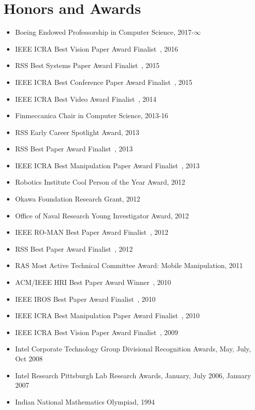 

\section{Honors and Awards}
\begin{itemize}
\addtolength{\itemsep}{-0.5\baselineskip}
\item Boeing Endowed Professorship in Computer Science, 2017-$\infty$
\item IEEE ICRA Best Vision Paper Award Finalist~\cite{klingensmith2016armslamconf}, 2016
\item RSS Best Systems Paper Award Finalist~\cite{klingensmith2015chisel}, 2015
\item IEEE ICRA Best Conference Paper Award Finalist~\cite{dragan2015dmp}, 2015
\item IEEE ICRA Best Video Award Finalist~\cite{chavandafle2014extrinsic}, 2014
\item Finmeccanica Chair in Computer Science, 2013-16
\item RSS Early Career Spotlight Award, 2013
\item RSS Best Paper Award Finalist~\cite{dragan2013legible}, 2013
\item IEEE ICRA Best Manipulation Paper Award Finalist~\cite{javdani2013tactile}, 2013
\item Robotics Institute Cool Person of the Year Award, 2012
\item Okawa Foundation Research Grant, 2012
\item Office of Naval Research Young Investigator Award, 2012
\item IEEE RO-MAN Best Paper Award Finalist~\cite{dragan2012custom}, 2012
\item RSS Best Paper Award Finalist~\cite{dragan2012formalizing}, 2012
\item RAS Most Active Technical Committee Award: Mobile Manipulation, 2011 
\item ACM/IEEE HRI Best Paper Award Winner~\cite{lee2010gracefully}, 2010
\item IEEE IROS Best Paper Award Finalist~\cite{dogar2010pushgrasp}, 2010
\item IEEE ICRA Best Manipulation Paper Award Finalist~\cite{chang2010pregrasp}, 2010
\item IEEE ICRA Best Vision Paper Award Finalist~\cite{collet2009object}, 2009
\item Intel Corporate Technology Group Divisional Recognition Awards, May, July, Oct 2008
\item Intel Research Pittsburgh Lab Research Awards, January, July 2006, January 2007
\item Indian National Mathematics Olympiad, 1994
\end{itemize}
